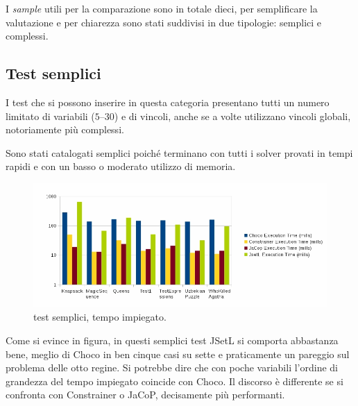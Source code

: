 I \emph{sample} utili per la comparazione sono in totale dieci, per
semplificare la valutazione e per chiarezza sono stati suddivisi in due
tipologie: semplici e complessi.

\subsection{Test semplici}
I test che si possono inserire in questa categoria presentano tutti un numero
limitato di variabili ($5$--$30$) e di vincoli, anche se a volte utilizzano
vincoli globali, notoriamente più complessi.

Sono stati catalogati semplici poiché terminano con tutti i solver provati
in tempi rapidi e con un basso o moderato utilizzo di memoria.
\begin{figure}[!ht]
\centering
\includegraphics[scale=.45]{img/grafico11.jpg}
\caption{test semplici, tempo impiegato.}
\end{figure}

Come si evince in figura, in questi semplici test JSetL si comporta abbastanza
bene, meglio di Choco in ben cinque casi su sette e praticamente un pareggio
sul problema delle otto regine. Si potrebbe dire che con poche variabili
l'ordine di grandezza del tempo impiegato coincide con Choco. Il discorso è
differente se si confronta con Constrainer o JaCoP, decisamente più performanti.


